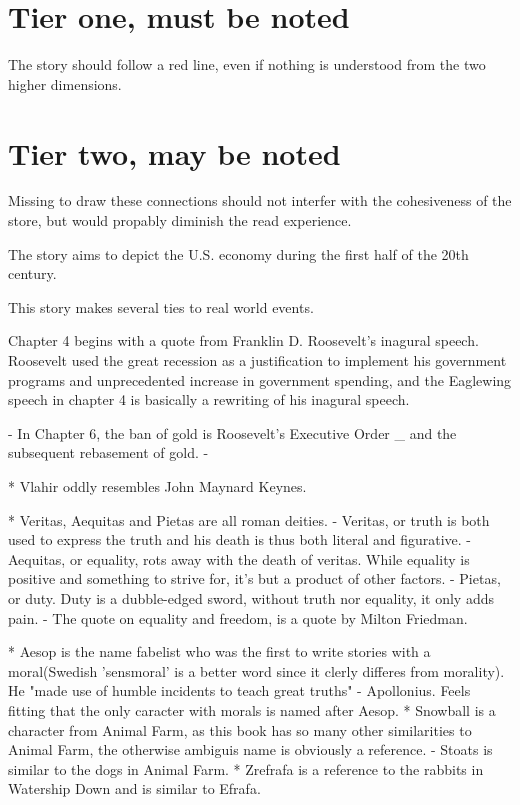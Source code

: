 
\section{Tier one, must be noted}

The story should follow a red line, even if nothing is understood from the two higher dimensions.


\section{Tier two, may be noted}

Missing to draw these connections should not interfer with the cohesiveness of the store,
but would propably diminish the read experience.

The story aims to depict the U.S. economy during the first half of the 20th century.

This story makes several ties to real world events.

Chapter 4 begins with a quote from Franklin D. Roosevelt's inagural speech.
Roosevelt used the great recession as a justification to implement his government
programs and unprecedented increase in government spending, and the Eaglewing
speech in chapter 4 is basically a rewriting of his inagural speech. 


- In Chapter 6, the ban of gold is Roosevelt's Executive Order _ and the subsequent 
rebasement of gold.
- 

* Vlahir oddly resembles John Maynard Keynes.

* Veritas, Aequitas and Pietas are all roman deities. 
- Veritas, or truth is both used to express the truth and his death is thus both literal and figurative.
- Aequitas, or equality, rots away with the death of veritas. While equality is positive and something to strive 
for, it's but a product of other factors. 
- Pietas, or duty. Duty is a dubble-edged sword, without truth nor equality, it only adds pain.
- The quote on equality and freedom, is a quote by Milton Friedman. 


* Aesop is the name fabelist who was the first to write stories with a moral(Swedish 'sensmoral' is a better word since it clerly differes from morality). He "made use of humble incidents to teach great truths" - Apollonius. Feels fitting that the only caracter with morals is named
after Aesop.
* Snowball is a character from Animal Farm, as this book has so many other similarities to Animal Farm, the otherwise ambiguis name is obviously a reference.
- Stoats is similar to the dogs in Animal Farm.
* Zrefrafa is a reference to the rabbits in Watership Down and is similar to Efrafa.


